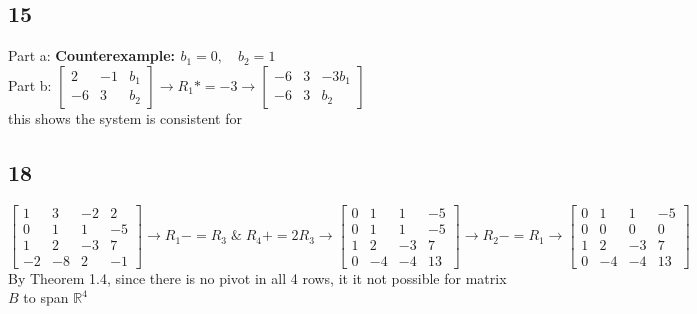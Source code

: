 \documentclass{article}
\begin{document}
\subsection*{15}
Part a: \textbf{Counterexample: $b_1=0,\quad b_2=1$}
\\Part b: $\begin{bmatrix}
    2&-1&b_1\\-6&3&b_2
\end{bmatrix}\rightarrow R_1 *=-3 \rightarrow \begin{bmatrix}
    -6&3&-3b_1\\-6&3&b_2
\end{bmatrix}$ \\[0.1in]this shows the system is consistent for \pagebreak
\subsection*{18}
$\begin{bmatrix}1 & 3 & -2 & 2 \\0 & 1 & 1 & -5 \\1 & 2 & -3 & 7 \\-2 & -8 & 2 & -1\end{bmatrix} \rightarrow R_1-=R_3 \; \& \; R_4+=2R_3\rightarrow 
\begin{bmatrix}0 & 1 & 1 & -5 \\0 & 1 & 1 & -5 \\1 & 2 & -3 & 7 \\0 & -4 & -4 & 13\end{bmatrix} \rightarrow R_2-=R_1\rightarrow
\begin{bmatrix}0 & 1 & 1 & -5 \\0 & 0 & 0 & 0 \\1 & 2 & -3 & 7 \\0 & -4 & -4 & 13\end{bmatrix}$
\\[0.1in]By Theorem 1.4, since there is no pivot in all 4 rows, it it not possible for matrix $B$ to span $\mathbb{R}^4$
\end{document}

